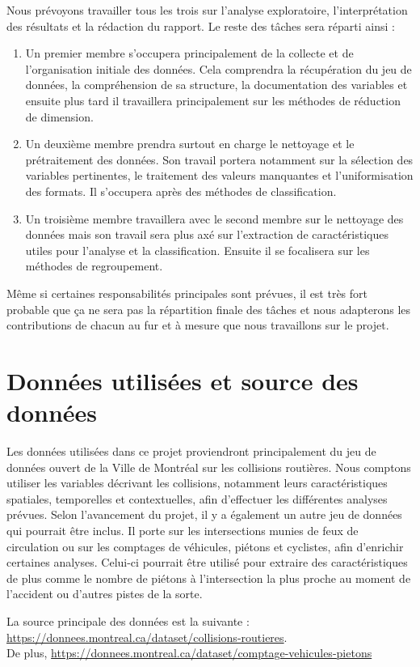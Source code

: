 \documentclass[10pt]{article}
\begin{document}
Nous prévoyons travailler tous les trois sur l’analyse exploratoire, l’interprétation des résultats et la rédaction du rapport. Le reste des tâches sera réparti ainsi :
\begin{enumerate}
    \item Un premier membre s’occupera principalement de la collecte et de l’organisation initiale des données. Cela comprendra la récupération du jeu de données, la compréhension de sa structure, la documentation des variables et ensuite plus tard il travaillera principalement sur les méthodes de réduction de dimension.
    \item Un deuxième membre prendra surtout en charge le nettoyage et le prétraitement des données. Son travail portera notamment sur la sélection des variables pertinentes, le traitement des valeurs manquantes et l’uniformisation des formats. Il s'occupera après des méthodes de classification.
    \item Un troisième membre travaillera avec le second membre sur le nettoyage des données mais son travail sera plus axé sur l'extraction de caractéristiques utiles pour l’analyse et la classification. Ensuite il se focalisera sur les méthodes de regroupement.
\end{enumerate}

Même si certaines responsabilités principales sont prévues, il est très fort probable que ça ne sera pas la répartition finale des tâches et nous adapterons les contributions de chacun au fur et à mesure que nous travaillons sur le projet.

\section{Données utilisées et source des données}

Les données utilisées dans ce projet proviendront principalement du jeu de données ouvert de la Ville de Montréal sur les collisions routières. Nous comptons utiliser les variables décrivant les collisions, notamment leurs caractéristiques spatiales, temporelles et contextuelles, afin d’effectuer les différentes analyses prévues. Selon l’avancement du projet, il y a également un autre jeu de données qui pourrait être inclus. Il porte sur les intersections munies de feux de circulation ou sur les comptages de véhicules, piétons et cyclistes, afin d’enrichir certaines analyses. Celui-ci pourrait être utilisé pour extraire des caractéristiques de plus comme le nombre de piétons à l'intersection la plus proche au moment de l'accident ou d'autres pistes de la sorte.

La source principale des données est la suivante : \url{https://donnees.montreal.ca/dataset/collisions-routieres}.\\
De plus, \url{https://donnees.montreal.ca/dataset/comptage-vehicules-pietons}
\end{document}
